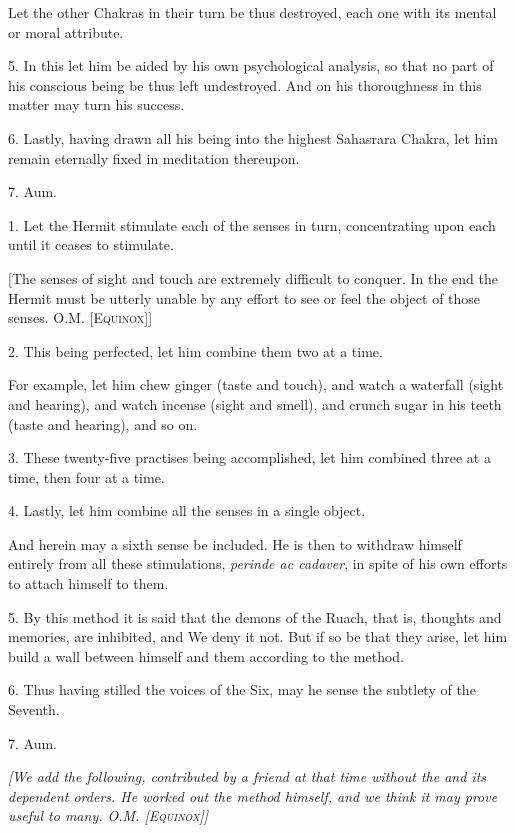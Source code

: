 Let the other Chakras in their turn be thus destroyed, each one with its mental or moral attribute.

5. In this let him be aided by his own psychological analysis, so that no part of his conscious being be thus left undestroyed. And on his thoroughness in this matter may turn his success.

6. Lastly, having drawn all his being into the highest Sahasrara Chakra, let him remain eternally fixed in meditation thereupon.

7. Aum.


1. Let the Hermit stimulate each of the senses in turn, concentrating upon each until it ceases to stimulate.

[The senses of sight and touch are extremely difficult to conquer. In the end the Hermit must be utterly unable by any effort to see or feel the object of those senses. O.M. \textsc{[Equinox]}]

2.  This being perfected, let him combine them two at a time.

For example, let him chew ginger (taste and touch), and watch a waterfall (sight and hearing), and watch incense (sight and smell), and crunch sugar in his teeth (taste and hearing), and so on.

3. These twenty-five practises being accomplished, let him combined three at a time, then four at a time.

4. Lastly, let him combine all the senses in a single object.

And herein may a sixth sense be included. He is then to withdraw himself entirely from all these stimulations, \textit{perinde ac cadaver}, in spite of his own efforts to attach himself to them.

5. By this method it is said that the demons of the Ruach, that is, thoughts and memories, are inhibited, and We deny it not. But if so be that they arise, let him build a wall between himself and them according to the method.

6. Thus having stilled the voices of the Six, may he sense the subtlety of the Seventh.

7. Aum.


\textit{[We add the following, contributed by a friend at that time without the \Argentium{} and its dependent orders. He worked out the method himself, and we think it may prove useful to many. O.M. \textsc{[Equinox]}]}

